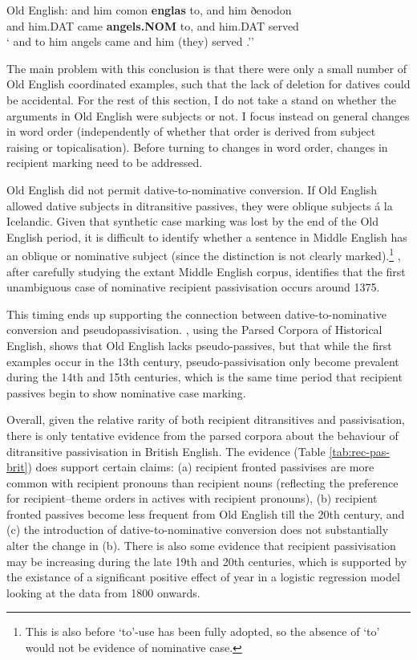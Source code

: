 	\begin{exe}
		\ex \label{ex:OECSD} Old English:
		\gll and him comon \textbf{englas} to, and him ðenodon\\
		and him.DAT came \textbf{angels.NOM} to, and him.DAT served\\
		\trans ` and to him angels came and him (they) served \citep[ex. 34]{Allen.1999}.''
	\end{exe}

	The main problem with this conclusion is that there were only a small number of Old English coordinated examples, such that the lack of deletion for datives could be accidental. For the rest of this section, I do not take a stand on whether the arguments in Old English were subjects or not. I focus instead on general changes in word order (independently of whether that order is derived from subject raising or topicalisation). Before turning to changes in word order, changes in recipient marking need to be addressed.

	Old English did not permit dative-to-nominative conversion. If Old English allowed dative subjects in ditransitive passives, they were oblique subjects \'{a} la Icelandic. Given that synthetic case marking was lost by the end of the Old English period, it is difficult to identify whether a sentence in Middle English has an oblique or nominative subject (since the distinction is not clearly marked).\footnote{This is also before `to'-use has been fully adopted, so the absence of `to' would not be evidence of nominative case.} \cite{Allen.1999}, after carefully studying the extant Middle English corpus, identifies that the first unambiguous case of nominative recipient passivisation occurs around 1375. 

	This timing ends up supporting the connection between dative-to-nominative conversion and pseudopassivisation. \cite{Sigursson.2014}, using the Parsed Corpora of Historical English, shows that Old English lacks pseudo-passives, but that while the first examples occur in the 13th century, pseudo-passivisation only become prevalent during the 14th and 15th centuries, which is the same time period that recipient passives begin to show nominative case marking.

	Overall, given the relative rarity of both recipient ditransitives and passivisation, there is only tentative evidence from the parsed corpora about the behaviour of ditransitive passivisation in British English. The evidence (Table \ref{tab:rec-pas-brit}) does support certain claims: (a) recipient fronted passivises are more common with recipient pronouns than recipient nouns (reflecting the preference for recipient--theme orders in actives with recipient pronouns), (b) recipient fronted passives become less frequent from Old English till the 20th century, and (c) the introduction of dative-to-nominative conversion does not substantially alter the change in (b). There is also some evidence that recipient passivisation may be increasing during the late 19th and 20th centuries, which is supported by the existance of a significant positive effect of year in a logistic regression model looking at the data from 1800 onwards.

